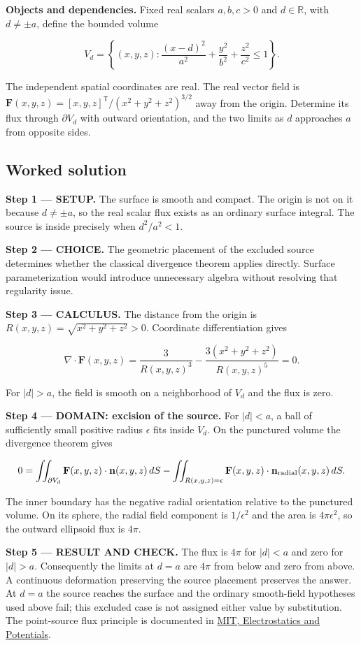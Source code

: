 \documentclass[11pt,oneside,openany]{book}
\begin{document}
\textbf{Objects and dependencies.} Fixed real scalars \(a,b,c>0\) and \(d\in\mathbb R\), with \(d\ne\pm a\), define the bounded volume

\[
V_d=\left\{(x,y,z):\frac{(x-d)^2}{a^2}+\frac{y^2}{b^2}+\frac{z^2}{c^2}\le1\right\}.
\]

The independent spatial coordinates are real. The real vector field is \(\mathbf F(x,y,z)=[x,y,z]^{\mathsf T}/(x^2+y^2+z^2)^{3/2}\) away from the origin. Determine its flux through \(\partial V_d\) with outward orientation, and the two limits as \(d\) approaches \(a\) from opposite sides.
\subsection*{Worked solution}

\textbf{Step 1 --- SETUP.} The surface is smooth and compact. The origin is not on it because \(d\ne\pm a\), so the real scalar flux exists as an ordinary surface integral. The source is inside precisely when \(d^2/a^2<1\).

\begin{ChoiceStep}
\textbf{Step 2 --- CHOICE.} The geometric placement of the excluded source determines whether the classical divergence theorem applies directly. Surface parameterization would introduce unnecessary algebra without resolving that regularity issue.

\end{ChoiceStep}
\textbf{Step 3 --- CALCULUS.} The distance from the origin is \(R(x,y,z)=\sqrt{x^2+y^2+z^2}>0\). Coordinate differentiation gives

\[
\nabla\cdot\mathbf F(x,y,z)
=\frac{3}{R(x,y,z)^3}-\frac{3(x^2+y^2+z^2)}{R(x,y,z)^5}=0.
\]

For \(|d|>a\), the field is smooth on a neighborhood of \(V_d\) and the flux is zero.

\begin{DomainStep}
\textbf{Step 4 --- DOMAIN: excision of the source.} For \(|d|<a\), a ball of sufficiently small positive radius \(\epsilon\) fits inside \(V_d\). On the punctured volume the divergence theorem gives

\[
0=\iint_{\partial V_d}\mathbf F(x,y,z)\cdot\mathbf n(x,y,z)\,dS
-\iint_{R(x,y,z)=\epsilon}\mathbf F(x,y,z)\cdot\mathbf n_{\rm radial}(x,y,z)\,dS.
\]

The inner boundary has the negative radial orientation relative to the punctured volume. On its sphere, the radial field component is \(1/\epsilon^2\) and the area is \(4\pi\epsilon^2\), so the outward ellipsoid flux is \(4\pi\).

\end{DomainStep}
\textbf{Step 5 --- RESULT AND CHECK.} The flux is \(4\pi\) for \(|d|<a\) and zero for \(|d|>a\). Consequently the limits at \(d=a\) are \(4\pi\) from below and zero from above. A continuous deformation preserving the source placement preserves the answer. At \(d=a\) the source reaches the surface and the ordinary smooth-field hypotheses used above fail; this excluded case is not assigned either value by substitution. The point-source flux principle is documented in \href{https://ocw.mit.edu/ans7870/18/18.013a/textbook/HTML/chapter28/section04.html}{MIT, Electrostatics and Potentials}.
\end{document}
